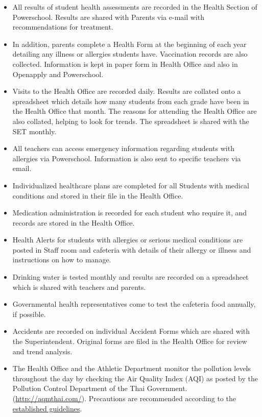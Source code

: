 \begin{itemize}
\item All results of student health assessments are recorded in the Health Section of Powerschool. Results are shared with Parents via e-mail with recommendations for treatment.
\item In addition, parents complete a Health Form at the beginning of each year detailing any illness or allergies students have. Vaccination records are also collected. Information is kept in paper form in Health Office and also in Openapply and Powerschool.
\item Visits to the Health Office are recorded daily. Results are collated onto a spreadsheet which details how many students from each grade have been in the Health Office that month. The reasons for attending the Health Office are also collated, helping to look for trends. The spreadsheet is shared with the SET monthly.
\item All teachers can access emergency information regarding students with allergies via Powerschool. Information is also sent to specific teachers via email.
\end{itemize}


\begin{itemize}
\item Individualized healthcare plans are completed for all Students with medical conditions and stored in their file in the Health Office.  
\item Medication administration is recorded for each student who require it, and records are stored in the Health Office.
\item Health Alerts for students with allergies or serious medical conditions are posted in Staff room and cafeteria with details of their allergy or illness and instructions on how to manage.
\end{itemize}


\begin{itemize}
\item Drinking water is tested monthly and results are recorded on a spreadsheet which is shared with teachers and parents.
\item Governmental health representatives come to test the cafeteria food annually, if possible.  
\item Accidents are recorded on individual Accident Forms which are shared with the Superintendent.  Original forms are filed in the Health Office for review and trend analysis.  
\item The Health Office and the Athletic Department monitor the pollution levels throughout the day by checking the Air Quality Index (AQI) as posted by the Pollution Control Department of the Thai Government. (\href{http://aqmthai.com/}{http://aqmthai.com/}).  Precautions are recommended according to the \href{https://docs.google.com/document/d/1RLrOBWjj_4ohMofL5RUIaWWwP66qTJ2NFEl_qY5U5Vw/edit?usp=sharing}{established guidelines}.  
\end{itemize}

